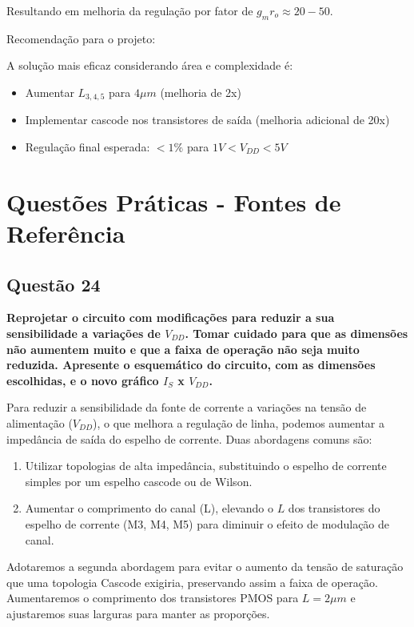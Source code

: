 ﻿\documentclass[12pt,a4paper]{article}
\begin{document}
Resultando em melhoria da regulação por fator de $g_m r_o \approx 20-50$.

Recomendação para o projeto:

A solução mais eficaz considerando área e complexidade é:
\begin{itemize}
    \item Aumentar $L_{3,4,5}$ para $4\mu m$ (melhoria de 2x)
    \item Implementar cascode nos transistores de saída (melhoria adicional de 20x)
    \item Regulação final esperada: $< 1\%$ para $1V < V_{DD} < 5V$
\end{itemize}

\newpage

\section*{Questões Práticas - Fontes de Referência}

\subsection*{Questão 24}

\textbf{Reprojetar o circuito com modificações para reduzir a sua sensibilidade a variações de $V_{DD}$. Tomar cuidado para que as dimensões não aumentem muito e que a faixa de operação não seja muito reduzida. Apresente o esquemático do circuito, com as dimensões escolhidas, e o novo gráfico $I_S$ x $V_{DD}$.}

Para reduzir a sensibilidade da fonte de corrente a variações na tensão de alimentação ($V_{DD}$), o que melhora a regulação de linha, podemos aumentar a impedância de saída do espelho de corrente. Duas abordagens comuns são:
\begin{enumerate}
    \item Utilizar topologias de alta impedância, substituindo o espelho de corrente simples por um espelho cascode ou de Wilson.
    \item Aumentar o comprimento do canal (L), elevando o $L$ dos transistores do espelho de corrente (M3, M4, M5) para diminuir o efeito de modulação de canal.
\end{enumerate}

Adotaremos a segunda abordagem para evitar o aumento da tensão de saturação que uma topologia Cascode exigiria, preservando assim a faixa de operação. Aumentaremos o comprimento dos transistores PMOS para $L=2\mu m$ e ajustaremos suas larguras para manter as proporções.
\end{document}
